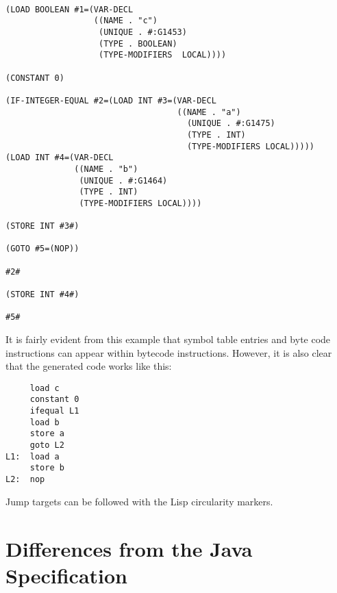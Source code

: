 \documentclass{article}[1994/05/24]
\begin{document}
\begin{verbatim}

(LOAD BOOLEAN #1=(VAR-DECL
                  ((NAME . "c")
                   (UNIQUE . #:G1453)
                   (TYPE . BOOLEAN)
                   (TYPE-MODIFIERS  LOCAL))))

(CONSTANT 0)

(IF-INTEGER-EQUAL #2=(LOAD INT #3=(VAR-DECL
                                   ((NAME . "a")
                                     (UNIQUE . #:G1475)
                                     (TYPE . INT)
                                     (TYPE-MODIFIERS LOCAL)))))
(LOAD INT #4=(VAR-DECL
              ((NAME . "b")
               (UNIQUE . #:G1464)
               (TYPE . INT)
               (TYPE-MODIFIERS LOCAL))))

(STORE INT #3#)

(GOTO #5=(NOP))

#2#

(STORE INT #4#)

#5#

\end{verbatim}

It is fairly evident from this example that symbol table
entries and byte code instructions can appear within  bytecode
instructions. However, it is also clear that the generated code
works like this:

\begin{verbatim}
     load c
     constant 0
     ifequal L1
     load b
     store a
     goto L2
L1:  load a
     store b
L2:  nop
\end{verbatim}

Jump targets can be followed with the Lisp circularity markers.

\section{Differences from the Java Specification}
\end{document}
